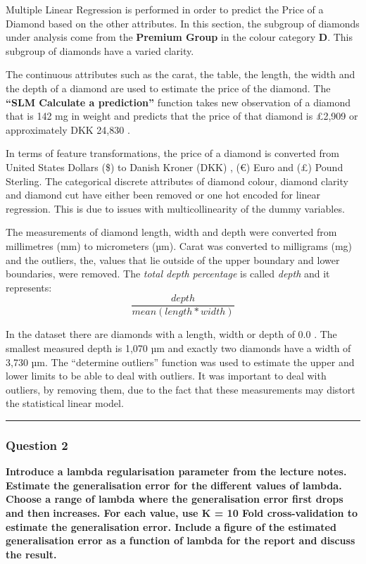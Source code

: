 \documentclass[
]{article}
\begin{document}
Multiple Linear Regression is performed in order to predict the Price of
a Diamond based on the other attributes. In this section, the subgroup
of diamonds under analysis come from the \textbf{Premium Group} in the
colour category \textbf{D}. This subgroup of diamonds have a varied
clarity.

The continuous attributes such as the carat, the table, the length, the
width and the depth of a diamond are used to estimate the price of the
diamond. The \textbf{``SLM Calculate a prediction''} function takes new
observation of a diamond that is 142 mg in weight and predicts that the
price of that diamond is £2,909 or approximately DKK 24,830 .

In terms of feature transformations, the price of a diamond is converted
from United States Dollars (\$) to Danish Kroner (DKK) , (€) Euro and
(£) Pound Sterling. The categorical discrete attributes of diamond
colour, diamond clarity and diamond cut have either been removed or one
hot encoded for linear regression. This is due to issues with
multicollinearity of the dummy variables.

The measurements of diamond length, width and depth were converted from
millimetres (mm) to micrometers (µm). Carat was converted to milligrams
(mg) and the outliers, the, values that lie outside of the upper
boundary and lower boundaries, were removed. The \emph{total depth
percentage} is called \emph{depth} and it represents:
\[\frac{depth} {mean( length * width)}\]

In the dataset there are diamonds with a length, width or depth of 0.0 .
The smallest measured depth is 1,070 µm and exactly two diamonds have a
width of 3,730 µm. The ``determine outliers'' function was used to
estimate the upper and lower limits to be able to deal with outliers. It
was important to deal with outliers, by removing them, due to the fact
that these measurements may distort the statistical linear model.

\begin{center}\rule{0.5\linewidth}{0.5pt}\end{center}

\hypertarget{question-2}{%
\subsubsection{Question 2}\label{question-2}}

\textbf{Introduce a lambda regularisation parameter from the lecture
notes. Estimate the generalisation error for the} \textbf{different
values of lambda. Choose a range of lambda where the generalisation
error first drops and then} \textbf{increases. For each value, use K =
10 Fold cross-validation to estimate the generalisation error. Include
a} \textbf{figure of the estimated generalisation error as a function of
lambda for the report and discuss the result.}
\end{document}
